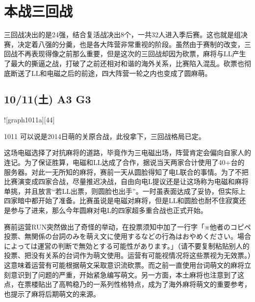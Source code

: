 \chapter{本战三回战}

三回战决出的是24强，结合复活战决出8个，一共32人进入季后赛。这也就是组决赛，决定着八强的分羹，也是各大阵营非常重视的阶段。虽然由于赛制的改变，三回战不再表现得像之前那么重要，但是这次的三回战却因为砍票，麻将与LL产生了最大的撕逼之战，打破了之前还相对和谐的海外关系，比赛陷入混乱。砍票也彻底断送了LL和电磁之后的前途，四大阵营一轮之内也变成了圆麻萌。

\section{10/11(土) A3 G3}


![graph1011a][44]

1011 可以说是2014日萌的关原合战，此役拿下，三回战格局已定。

这场电磁选择了对抗麻将的道路，毕竟作为三电磁出场，阵营肯定会偏向自家人的连记。为了保证胜算，电磁和LL达成了合作，据说当天两家合计使用了40+台的服务器。对此一无所知的麻将，赛前一天从圆脸得知了电L联合的事情。为了不把比赛演变成四家合战，尽量推迟决战，自由向电L提议还是让这场称为电磁和麻将单挑，并且放言“若LL出票，则圆脸也出手”。一时虽表面达成了妥协，但实际上四家暗中都开始了准备。比赛虽说是电磁对麻将，但是LL和圆脸也耐不住寂寞还是参与了进来，那么今年圆麻对电L的四家超多重合战也正式开始。

赛前运营RUN突然做出了奇怪的举动，在投票须知中加了一行字「※他者のコピペ投票、無関係の台詞のみを萌え文に使用するなどの行為はおやめください。場合によっては運営の判断で無効とする可能性があります。」（请不要复制粘贴别人的投票、把没有关系的台词作为萌文使用。运营有可能视情况将这些票视为无效票。）这意味着运营有可能根据萌文采取意识流砍票。而之前一直使用台词萌文的麻将立刻意识到了问题的严重，开始紧急编写萌文。另一方面，本土麻将也注意到了这点，在票楼贴出了高鸭稳乃的一系列性格特点，成为了海外麻将萌文的重要参考，也提示了麻将后期萌文的来源。

